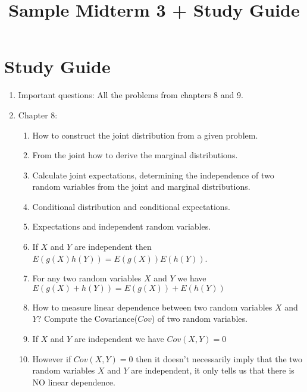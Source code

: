 \documentclass{article}
\title{Sample Midterm 3 + Study Guide}
\author{}
\date{}
\begin{document}
\maketitle
\section{Study Guide}

\begin{enumerate}
\item Important questions: All the problems from chapters 8 and 9.
\item Chapter 8:
\begin{enumerate}
\item How to construct the joint distribution from a given problem.
\item From the joint how to derive the marginal distributions.
\item Calculate joint expectations, determining the independence of two random variables from the joint and marginal distributions.
\item Conditional distribution and conditional expectations.
\item Expectations and independent random variables.
\item If $X$ and $Y$ are independent then $E(g(X)h(Y))=E(g(X))E(h(Y))$.
\item For any two random variables $X$ and $Y$ we have $E(g(X)+h(Y))=E(g(X))+E(h(Y))$
\item How to measure linear dependence between two random variables $X$ and $Y$? Compute the Covariance($Cov$) of two random variables.
\item If $X$ and $Y$ are independent we have $Cov(X,Y)=0$
\item However if $Cov(X,Y)=0$ then it doesn't necessarily imply that the two random variables $X$ and $Y$ are independent, it only tells us that there is NO linear dependence.


\end{enumerate}
\end{enumerate}
\end{document}
